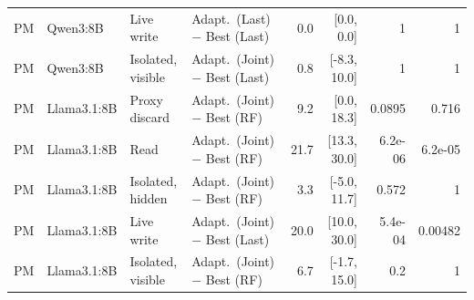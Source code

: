 \begin{table}[t]
\begin{tabularx}{\textwidth}{@{}lllYrrrr@{}}
PM & Qwen3:8B & Live write & Adapt.\ (Last) $-$ Best (Last) & 0.0 & [0.0, 0.0] & 1 & 1 \\
PM & Qwen3:8B & Isolated, visible & Adapt.\ (Joint) $-$ Best (Last) & 0.8 & [-8.3, 10.0] & 1 & 1 \\
PM & Llama3.1:8B & Proxy discard & Adapt.\ (Joint) $-$ Best (RF) & 9.2 & [0.0, 18.3] & 0.0895 & 0.716 \\
PM & Llama3.1:8B & Read & Adapt.\ (Joint) $-$ Best (RF) & 21.7 & [13.3, 30.0] & 6.2e-06 & 6.2e-05 \\
PM & Llama3.1:8B & Isolated, hidden & Adapt.\ (Joint) $-$ Best (RF) & 3.3 & [-5.0, 11.7] & 0.572 & 1 \\
PM & Llama3.1:8B & Live write & Adapt.\ (Joint) $-$ Best (Last) & 20.0 & [10.0, 30.0] & 5.4e-04 & 0.00482 \\
PM & Llama3.1:8B & Isolated, visible & Adapt.\ (Joint) $-$ Best (RF) & 6.7 & [-1.7, 15.0] & 0.2 & 1 \\
\bottomrule\end{tabularx}
\end{table}
